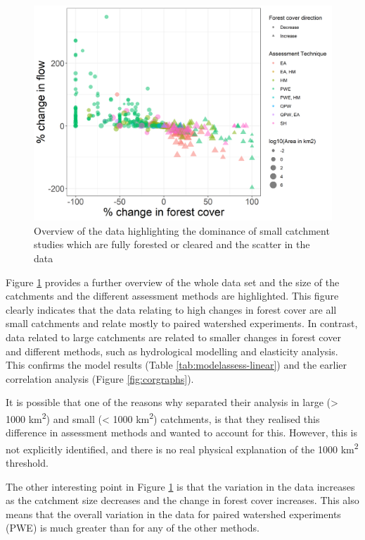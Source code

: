 \documentclass[]{elsarticle} %
\begin{document}
\begin{figure}
\includegraphics[width=0.9\linewidth]{flow_forest_byArea} \caption{Overview of the data highlighting the dominance of small catchment studies which are fully forested or cleared and the scatter in the data}\label{fig:overview}
\end{figure}

Figure \ref{fig:overview} provides a further overview of the whole data set and the size of the catchments and the different assessment methods are highlighted. This figure clearly indicates that the data relating to high changes in forest cover are all small catchments and relate mostly to paired watershed experiments. In contrast, data related to large catchments are related to smaller changes in forest cover and different methods, such as hydrological modelling and elasticity analysis. This confirms the model results (Table \ref{tab:modelassess-linear}) and the earlier correlation analysis (Figure \ref{fig:corgraphs}).

It is possible that one of the reasons why \citet{zhang2017} separated their analysis in large (\textgreater{} 1000 km\textsuperscript{2}) and small (\textless{} 1000 km\textsuperscript{2}) catchments, is that they realised this difference in assessment methods and wanted to account for this. However, this is not explicitly identified, and there is no real physical explanation of the 1000 km\textsuperscript{2} threshold.

The other interesting point in Figure \ref{fig:overview} is that the variation in the data increases as the catchment size decreases and the change in forest cover increases. This also means that the overall variation in the data for paired watershed experiments (PWE) is much greater than for any of the other methods.
\end{document}
